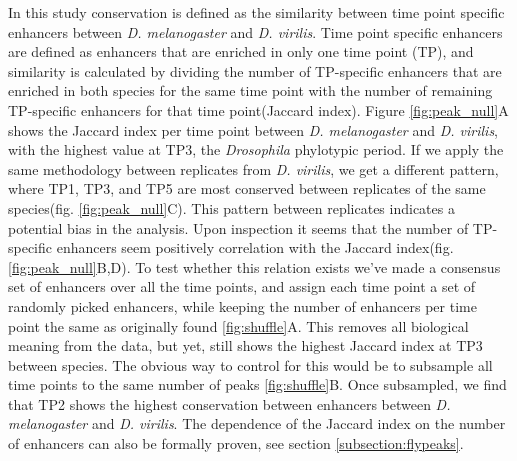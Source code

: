 In this study conservation is defined as the similarity between time point specific enhancers between \textit{D. melanogaster} and \textit{D. virilis}. Time point specific enhancers are defined as enhancers that are enriched in only one time point (TP), and similarity is calculated by dividing the number of TP-specific enhancers that are enriched in both species for the same time point with the number of remaining TP-specific enhancers for that time point(Jaccard index). Figure \ref{fig:peak_null}A shows the Jaccard index per time point between \textit{D. melanogaster} and \textit{D. virilis}, with the highest value at TP3, the \textit{Drosophila} phylotypic period\cite{Liu2021}. If we apply the same methodology between replicates from \textit{D. virilis}, we get a different pattern, where TP1, TP3, and TP5 are most conserved between replicates of the same species(fig. \ref{fig:peak_null}C). This pattern between replicates indicates a potential bias in the analysis. Upon inspection it seems that the number of TP-specific enhancers seem positively correlation with the Jaccard index(fig. \ref{fig:peak_null}B,D). To test whether this relation exists we've made a consensus set of enhancers over all the time points, and assign each time point a set of randomly picked enhancers, while keeping the number of enhancers per time point the same as originally found \ref{fig:shuffle}A. This removes all biological meaning from the data, but yet, still shows the highest Jaccard index at TP3 between species. The obvious way to control for this would be to subsample all time points to the same number of peaks \ref{fig:shuffle}B. Once subsampled, we find that TP2 shows the highest conservation between enhancers between \textit{D. melanogaster} and \textit{D. virilis}. The dependence of the Jaccard index on the number of enhancers can also be formally proven, see section \ref{subsection:flypeaks}. 

